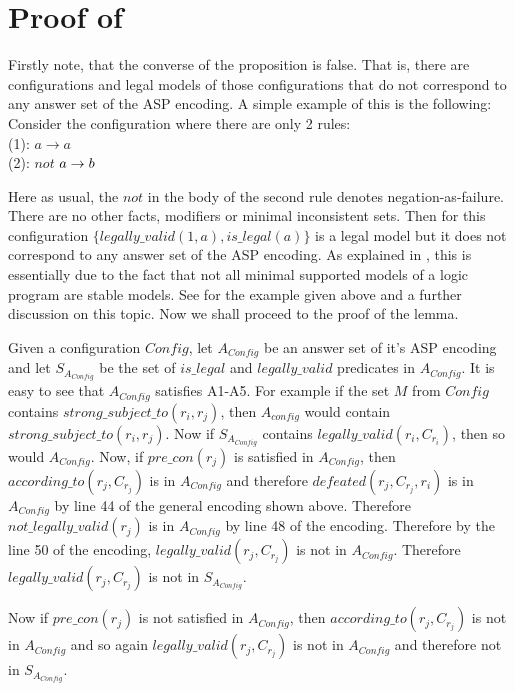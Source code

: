 \section{Proof of }

Firstly note, that the converse of the proposition is false. That is, there are configurations and legal models of those configurations that do not correspond to any answer set of the ASP encoding. A simple example of this is the following: Consider the configuration where there are only 2 rules:\\ (1): $a\rightarrow a$\\
(2): $not$ $a\rightarrow b\\$

Here as usual, the $not$ in the body of the second rule denotes negation-as-failure. There are no other facts, modifiers or minimal inconsistent sets. Then for this configuration $\{legally\_valid(1,a), is\_legal(a)\}$ is a legal model but it does not correspond to any answer set of the ASP encoding. As explained in \citep{KRR_notes}, this is essentially due to the fact that not all minimal supported models of a logic program are stable models. See \citep{KRR_notes} for the example given above and a further discussion on this topic.  Now we shall proceed to the proof of the lemma.

Given a configuration $Config$, let $A_{Config}$ be an answer set of it's ASP encoding and let $S_{A_{Config}}$ be the set of $is\_legal$ and $legally\_valid$ predicates in $A_{Config}$. It is easy to see that $A_{Config}$ satisfies A1-A5. For example if the set $M$ from $Config$ contains $strong\_subject\_to(r_{i}, r_{j})$, then $A_{config}$ would contain $strong\_subject\_to(r_{i}, r_{j})$. Now if $S_{A_{Config}}$ contains $legally\_valid(r_{i}, C_{r_{i}})$, then so would $A_{Config}$. Now, if $pre\_con(r_{j})$ is satisfied in $A_{Config}$, then $according\_to(r_{j},C_{r_{j}})$ is in $A_{Config}$ and therefore $defeated(r_{j}, C_{r_{j}}, r_{i})$ is in $A_{Config}$ by line 44 of the general encoding shown above. Therefore $not\_legally\_valid(r_{j})$ is in $A_{Config}$ by line 48 of the encoding. Therefore by the line 50 of the encoding, $legally\_valid(r_{j},C_{r_{j}})$ is not in $A_{Config}$. Therefore $legally\_valid(r_{j},C_{r_{j}})$ is not in $S_{A_{Config}}$.

Now if $pre\_con(r_{j})$ is not satisfied in $A_{Config}$, then $according\_to(r_{j},C_{r_{j}})$ is not in $A_{Config}$ and so again $legally\_valid(r_{j},C_{r_{j}})$ is not in $A_{Config}$ and therefore not in $S_{A_{Config}}$.

